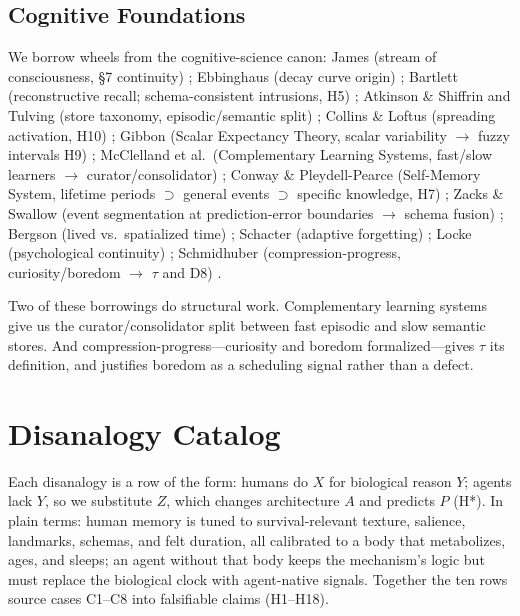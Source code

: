 \documentclass[letterpaper]{article}
\begin{document}
\subsection{Cognitive Foundations}
We borrow wheels from the cognitive-science canon: James (stream of consciousness, \S7 continuity) \citep{james1890principles}; Ebbinghaus (decay curve origin) \citep{ebbinghaus1885memory}; Bartlett (reconstructive recall; schema-consistent intrusions, H5) \citep{bartlett1932remembering}; Atkinson \& Shiffrin and Tulving (store taxonomy, episodic/semantic split) \citep{atkinson1968human,tulving1972episodic,tulving1983elements}; Collins \& Loftus (spreading activation, H10) \citep{collins1975spreading}; Gibbon (Scalar Expectancy Theory, scalar variability $\to$ fuzzy intervals H9) \citep{gibbon1977scalar}; McClelland et al.\ (Complementary Learning Systems, fast/slow learners $\to$ curator/consolidator) \citep{mcclelland1995cls}; Conway \& Pleydell-Pearce (Self-Memory System, lifetime periods $\supset$ general events $\supset$ specific knowledge, H7) \citep{conway2000sms}; Zacks \& Swallow (event segmentation at prediction-error boundaries $\to$ schema fusion) \citep{zacks2007event}; Bergson (lived vs.\ spatialized time) \citep{bergson1889duree}; Schacter (adaptive forgetting) \citep{schacter2001seven}; Locke (psychological continuity) \citep{locke1690essay}; Schmidhuber (compression-progress, curiosity/boredom $\to$ $\tau$ and D8) \citep{schmidhuber1991curiosity}.

Two of these borrowings do structural work. Complementary learning systems give us the curator/consolidator split between fast episodic and slow semantic stores. And compression-progress---curiosity and boredom formalized---gives $\tau$ its definition, and justifies boredom as a scheduling signal rather than a defect.

\section{Disanalogy Catalog}
Each disanalogy is a row of the form: humans do $X$ for biological reason $Y$; agents lack $Y$, so we substitute $Z$, which changes architecture $A$ and predicts $P$ (H*). In plain terms: human memory is tuned to survival-relevant texture, salience, landmarks, schemas, and felt duration, all calibrated to a body that metabolizes, ages, and sleeps; an agent without that body keeps the mechanism's logic but must replace the biological clock with agent-native signals. Together the ten rows source cases C1--C8 into falsifiable claims (H1--H18).
\end{document}
